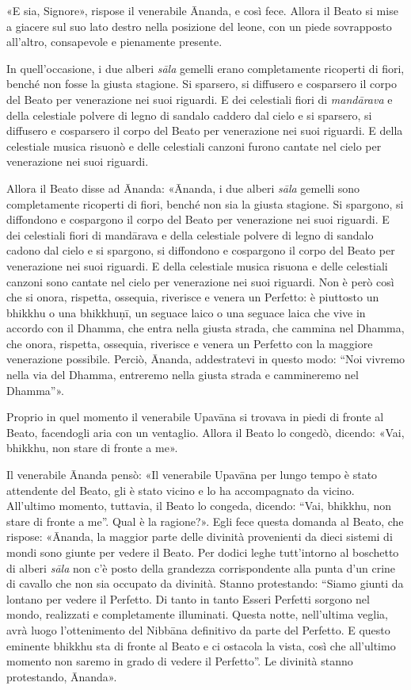 «E sia, Signore», rispose il venerabile Ānanda, e così fece. Allora il
Beato si mise a giacere sul suo lato destro nella posizione del leone,
con un piede sovrapposto all’altro, consapevole e pienamente presente.


In quell’occasione, i due alberi \emph{sāla} gemelli erano completamente
ricoperti di fiori, benché non fosse la giusta stagione. Si sparsero, si
diffusero e cosparsero il corpo del Beato per venerazione nei suoi
riguardi. E dei celestiali fiori di \emph{mandārava} e della celestiale
polvere di legno di sandalo caddero dal cielo e si sparsero, si
diffusero e cosparsero il corpo del Beato per venerazione nei suoi
riguardi. E della celestiale musica risuonò e delle celestiali canzoni
furono cantate nel cielo per venerazione nei suoi riguardi.


Allora il Beato disse ad Ānanda: «Ānanda, i due alberi \emph{sāla} gemelli
sono completamente ricoperti di fiori, benché non sia la giusta
stagione. Si spargono, si diffondono e cospargono il corpo del Beato per
venerazione nei suoi riguardi. E dei celestiali fiori di mandārava e
della celestiale polvere di legno di sandalo cadono dal cielo e si
spargono, si diffondono e cospargono il corpo del Beato per venerazione
nei suoi riguardi. E della celestiale musica risuona e delle celestiali
canzoni sono cantate nel cielo per venerazione nei suoi riguardi. Non è
però così che si onora, rispetta, ossequia, riverisce e venera un
Perfetto: è piuttosto un bhikkhu o una bhikkhuṇī, un seguace laico o una
seguace laica che vive in accordo con il Dhamma, che entra nella giusta
strada, che cammina nel Dhamma, che onora, rispetta, ossequia, riverisce
e venera un Perfetto con la maggiore venerazione possibile. Perciò,
Ānanda, addestratevi in questo modo: “Noi vivremo nella via del Dhamma,
entreremo nella giusta strada e cammineremo nel Dhamma”».


Proprio in quel momento il venerabile Upavāna si trovava in piedi di
fronte al Beato, facendogli aria con un ventaglio. Allora il Beato lo
congedò, dicendo: «Vai, bhikkhu, non stare di fronte a me».


Il venerabile Ānanda pensò: «Il venerabile Upavāna per lungo tempo è
stato attendente del Beato, gli è stato vicino e lo ha accompagnato da
vicino. All’ultimo momento, tuttavia, il Beato lo congeda, dicendo:
“Vai, bhikkhu, non stare di fronte a me”. Qual è la ragione?». Egli fece
questa domanda al Beato, che rispose: «Ānanda, la maggior parte delle
divinità provenienti da dieci sistemi di mondi sono giunte per vedere il
Beato. Per dodici leghe tutt’intorno al boschetto di alberi \emph{sāla} non
c’è posto della grandezza corrispondente alla punta d’un crine di
cavallo che non sia occupato da divinità. Stanno protestando: “Siamo
giunti da lontano per vedere il Perfetto. Di tanto in tanto Esseri
Perfetti sorgono nel mondo, realizzati e completamente illuminati.
Questa notte, nell’ultima veglia, avrà luogo l’ottenimento del Nibbāna
definitivo da parte del Perfetto. E questo eminente bhikkhu sta di
fronte al Beato e ci ostacola la vista, così che all’ultimo momento non
saremo in grado di vedere il Perfetto”. Le divinità stanno protestando,
Ānanda».



